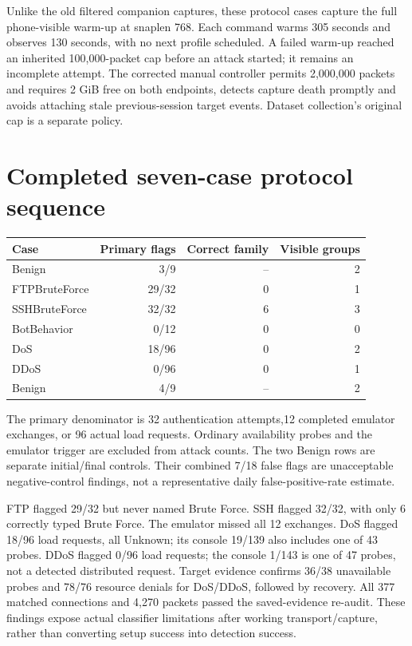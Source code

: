 \documentclass[11pt,a4paper,oneside]{report}
\begin{document}
Unlike the old filtered companion captures, these protocol cases capture the full phone-visible warm-up at snaplen 768. Each command warms 305 seconds and observes 130 seconds, with no next profile scheduled. A failed warm-up reached an inherited 100,000-packet cap before an attack started; it remains an incomplete attempt. The corrected manual controller permits 2,000,000 packets and requires 2 GiB free on both endpoints, detects capture death promptly and avoids attaching stale previous-session target events. Dataset collection's original cap is a separate policy.

\section{Completed seven-case protocol sequence}

{\small
\begin{longtable}{@{}p{}rrr@{}}
\toprule
Case & Primary flags & Correct family & Visible groups\\\midrule\endhead
Benign & 3/9 & -- & 2\\
FTPBruteForce & 29/32 & 0 & 1\\
SSHBruteForce & 32/32 & 6 & 3\\
BotBehavior & 0/12 & 0 & 0\\
DoS & 18/96 & 0 & 2\\
DDoS & 0/96 & 0 & 1\\
Benign & 4/9 & -- & 2\\
\bottomrule\end{longtable}
}

The primary denominator is 32 authentication attempts,12 completed emulator exchanges, or 96 actual load requests. Ordinary availability probes and the emulator trigger are excluded from attack counts. The two Benign rows are separate initial/final controls. Their combined 7/18 false flags are unacceptable negative-control findings, not a representative daily false-positive-rate estimate.

FTP flagged 29/32 but never named Brute Force. SSH flagged 32/32, with only 6 correctly typed Brute Force. The emulator missed all 12 exchanges. DoS flagged 18/96 load requests, all Unknown; its console 19/139 also includes one of 43 probes. DDoS flagged 0/96 load requests; the console 1/143 is one of 47 probes, not a detected distributed request. Target evidence confirms 36/38 unavailable probes and 78/76 resource denials for DoS/DDoS, followed by recovery. All 377 matched connections and 4,270 packets passed the saved-evidence re-audit. These findings expose actual classifier limitations after working transport/capture, rather than converting setup success into detection success.
\end{document}
